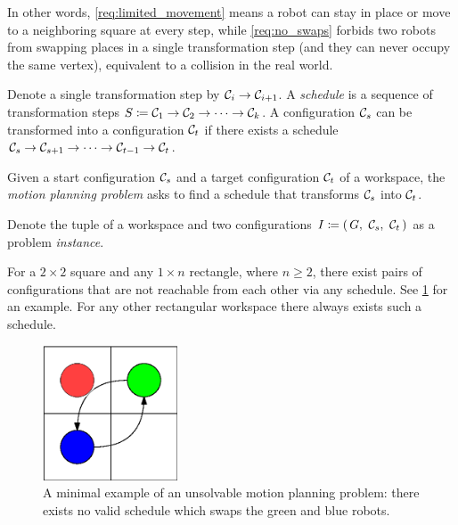 In other words, \cref{req:limited_movement} means a robot can stay in place or move to a neighboring square at every step, while \cref{req:no_swaps} forbids two robots from swapping places in a single transformation step (and they can never occupy the same vertex), equivalent to a collision in the real world.

Denote a single transformation step by \(\mathcal{C}_{i} \rightarrow \mathcal{C}_{i + 1}\). 
A \emph{schedule} is a sequence of transformation steps \(S \coloneqq \mathcal{C}_{1} \rightarrow \mathcal{C}_{2} \rightarrow \cdots \rightarrow \mathcal{C}_{k}\). 
A configuration \(\mathcal{C}_{s}\) can be transformed into a configuration \(\mathcal{C}_{t}\) if there exists a schedule \(\mathcal{C}_{s} \rightarrow \mathcal{C}_{s + 1} \rightarrow \cdots \rightarrow \mathcal{C}_{t - 1} \rightarrow \mathcal{C}_{t}\).

\begin{definition}\label{def:motion_planning_problem}
	Given a start configuration \(\mathcal{C}_{s}\) and a target configuration \(\mathcal{C}_{t}\) of a workspace, the \emph{motion planning problem} asks to find a schedule that transforms \(\mathcal{C}_{s}\) into \(\mathcal{C}_{t}\).
\end{definition}

Denote the tuple of a workspace and two configurations \(I \coloneqq \parens{G,\ \conf{s},\ \conf{t}}\) as a problem \emph{instance}. 

\begin{remark}\label{remark:reachability}
	For a \(2 \times 2\) square and any \(1 \times n\) rectangle, where \(n \geq 2\), there exist pairs of configurations that are not reachable from each other via any schedule. 
	See \cref{fig:reachability} for an example. For any other rectangular workspace there always exists such a schedule. 
\end{remark}

\begin{figure}[h]
	\centering
	\includegraphics[width=4cm]{include/impossible_2x2.eps}
	\caption{A minimal example of an unsolvable motion planning problem: there exists no valid schedule which swaps the green and blue robots.}\label{fig:reachability}
\end{figure}

